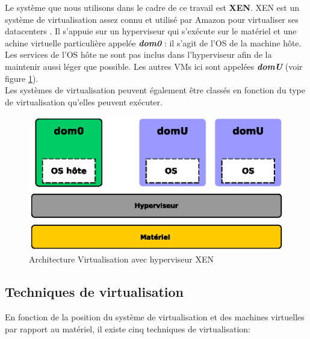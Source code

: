 Le système que nous utilisons dans le cadre de ce travail est \textbf{XEN}. XEN est un système de virtualisation assez connu \cite{article2} et utilisé par Amazon pour virtualiser ses datacenters \cite{online4}. Il s'appuie sur un hyperviseur qui s'exécute sur le matériel et une achine virtuelle particulière appelée \textit{\textbf{dom0}} : il s'agit de l'OS de la machine hôte. Les services de l'OS hôte ne sont pas inclus dans l'hyperviseur afin de la maintenir aussi léger que possible. Les autres VMs ici sont appelées \textit{\textbf{domU}} (voir figure \ref{fig:virtualisation_xen}).\\
Les systèmes de virtualisation peuvent également être classés en fonction du type de virtualisation qu'elles peuvent exécuter.

\begin{figure}[htp]
      \centering
      \includegraphics[scale=.8]{fig1/virtualisation_xen}
      \caption{Architecture Virtualisation avec hyperviseur XEN}
      \label{fig:virtualisation_xen}
    \end{figure}

\subsection{Techniques de virtualisation}
En fonction de la position du système de virtualisation et des machines virtuelles par rapport au matériel, il existe cinq techniques de virtualisation:

